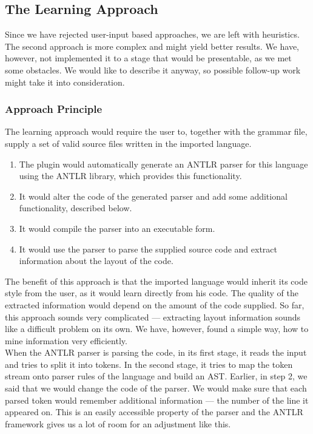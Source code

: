 \subsection{The Learning Approach}
\label{chap:learning_approach}

Since we have rejected user-input based approaches, we are left with heuristics.
The second approach is more complex and might yield better results.
We have, however, not implemented it to a stage that would be presentable, as we met some obstacles.
We would like to describe it anyway, so possible follow-up work might take it into consideration.
\\

\subsubsection{Approach Principle}

The learning approach would require the user to, together with the grammar file, supply a set of valid source files written in the imported language.

\begin{enumerate}
	\item The plugin would automatically generate an ANTLR parser for this language using the ANTLR library, which provides this functionality.

	\item It would alter the code of the generated parser and add some additional functionality, described below.

	\item It would compile the parser into an executable form.

	\item It would use the parser to parse the supplied source code and extract information about the layout of the code.
\end{enumerate}

The benefit of this approach is that the imported language would inherit its code style from the user, as it would learn directly from his code.
The quality of the extracted information would depend on the amount of the code supplied.
So far, this approach sounds very complicated --- extracting layout information sounds like a difficult problem on its own.
We have, however, found a simple way, how to mine information very efficiently.
\\

When the ANTLR parser is parsing the code, in its first stage, it reads the input and tries to split it into tokens.
In the second stage, it tries to map the token stream onto parser rules of the language and build an AST.
Earlier, in step 2, we said that we would change the code of the parser.
We would make sure that each parsed token would remember additional information --- the number of the line it appeared on.
This is an easily accessible property of the parser and the ANTLR framework gives us a lot of room for an adjustment like this.
\\

